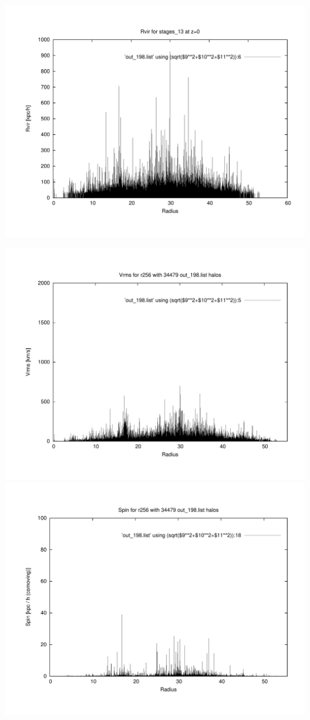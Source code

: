 \includegraphics[scale=0.3]{r256/stages_13/plot_rvir_z0.pdf}

\includegraphics[scale=0.3]{r256/stages_13/plot_Vrms_out_198.pdf}
\includegraphics[scale=0.3]{r256/stages_13/plot_spin_out_198.pdf}

